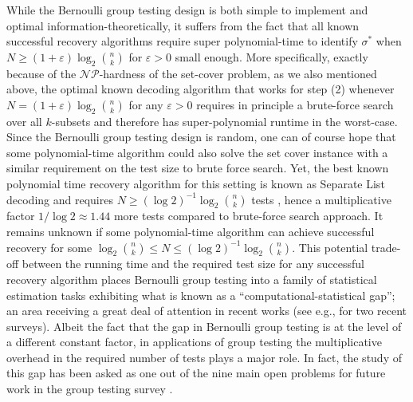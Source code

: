 \documentclass[12pt,reqno]{amsart}
\numberwithin{equation}{section}
\theoremstyle{definition}
\renewcommand{\epsilon}{\varepsilon}
\renewcommand{\[}{\begin{equation}}
\renewcommand{\]}{\end{equation}}
\renewcommand{\|}{\bigg{|}}
\begin{document}
While the Bernoulli group testing design is both simple to implement and optimal information-theoretically, it suffers from the fact that all known successful recovery algorithms require super polynomial-time to identify $\sigma^*$ when $N\geq  (1+\epsilon) \log_2 \binom{n}{k}$ for $\epsilon>0$ small enough. More specifically, exactly because of the $\mathcal{NP}$-hardness of the set-cover problem, as we also mentioned above, the optimal known decoding algorithm that works for step (2) whenever $ N= (1+\epsilon) \log_2 \binom{n}{k}$ for any $\epsilon>0$ requires in principle a brute-force search over all $k$-subsets and therefore has super-polynomial runtime in the worst-case. Since the Bernoulli group testing design is random, one can of course hope that some polynomial-time algorithm could also solve the set cover instance with a similar requirement on the test size to brute force search. Yet, the best known polynomial time recovery algorithm for this setting is known as Separate List decoding and requires $ N \geq (\log 2)^{-1} \log_2 \binom{n}{k}$ tests \cite{Aldridge_2019, scarlett2018near}, hence a multiplicative factor $1/\log 2\approx 1.44$ more tests compared to brute-force search approach. It remains unknown if some polynomial-time algorithm can achieve successful recovery for some $\log_2 \binom{n}{k} \leq N \leq (\log 2)^{-1} \log_2 \binom{n}{k}$. This potential trade-off between the running time and the required test size for any successful recovery algorithm places Bernoulli group testing into a family of statistical estimation tasks exhibiting what is known as a ``computational-statistical gap''; an area receiving a great deal of attention in recent works (see e.g., \cite{kunisky2019notes, gamarnik2022disordered} for two recent surveys). Albeit the fact that the gap in Bernoulli group testing is at the level of a different constant factor, in applications of group testing the multiplicative overhead in the required number of tests plays a major role. In fact, the study of this gap has been asked as one out of the nine main open problems for future work in the group testing survey \cite[Open Problem 3]{Aldridge_2019}.
\end{document}
